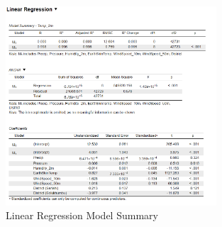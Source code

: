 \begin{figure}[h]
\centering
\includegraphics[width=0.7\textwidth]{figures/regression_jasp.png}
\caption{Linear Regression Model Summary}
\end{figure}

